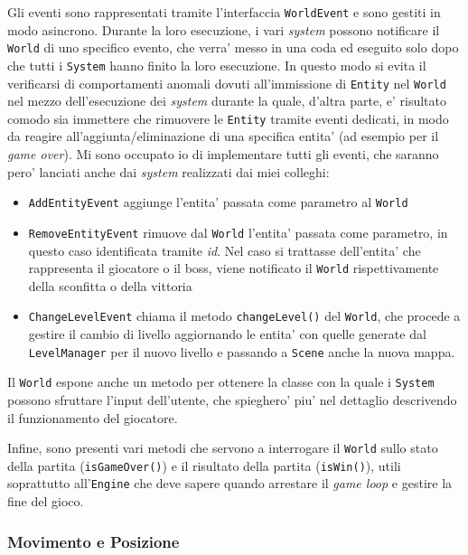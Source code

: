 \documentclass[a4paper,12pt]{report}
\begin{document}
Gli eventi sono rappresentati tramite l'interfaccia \texttt{WorldEvent} e sono gestiti in modo asincrono. Durante la loro esecuzione, i vari \textit{system} possono notificare il \texttt{World} di uno specifico evento, che verra' messo in una coda ed eseguito solo dopo che tutti i \texttt{System} hanno finito la loro esecuzione. In questo modo si evita il verificarsi di comportamenti anomali dovuti all'immissione di \texttt{Entity} nel \texttt{World} nel mezzo dell'esecuzione dei \textit{system} durante la quale, d'altra parte, e' risultato comodo sia immettere che rimuovere le \texttt{Entity} tramite eventi dedicati, in modo da reagire all'aggiunta/eliminazione di una specifica entita' (ad esempio per il \textit{game over}). Mi sono occupato io di implementare tutti gli eventi, che saranno pero' lanciati anche dai \textit{system} realizzati dai miei colleghi:
\begin{itemize}
	\item \texttt{AddEntityEvent} aggiunge l'entita' passata come parametro al \texttt{World}
	\item \texttt{RemoveEntityEvent} rimuove dal \texttt{World} l'entita' passata come parametro, in questo caso identificata tramite \textit{id}. Nel caso si trattasse dell'entita' che rappresenta il giocatore o il boss, viene notificato il \texttt{World} rispettivamente della sconfitta o della vittoria
	\item \texttt{ChangeLevelEvent} chiama il metodo \texttt{changeLevel()} del \texttt{World}, che procede a gestire il cambio di livello aggiornando le entita' con quelle generate dal \texttt{LevelManager} per il nuovo livello e passando a \texttt{Scene} anche la nuova mappa.
\end{itemize}

Il \texttt{World} espone anche un metodo per ottenere la classe con la quale i \texttt{System} possono sfruttare l'input dell'utente, che spieghero' piu' nel dettaglio descrivendo il funzionamento del giocatore.

Infine, sono presenti vari metodi che servono a interrogare il \texttt{World} sullo stato della partita
(\texttt{isGameOver()}) e il risultato della partita (\texttt{isWin()}), utili soprattutto all'\texttt{Engine} che deve sapere quando arrestare il \textit{game loop} e gestire la fine del gioco.

\subsubsection{Movimento e Posizione}
\end{document}
